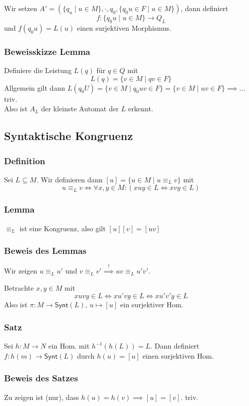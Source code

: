 \documentclass[12pt, german]{article}
\newcommand{\inv}{^{-1}}
\newcommand{\synt}{\mathsf{Synt}}
\begin{document}
	Wir setzen $A' = (\{q_u \mid u \in M\}, \cdot, q_0, \{q_0u \in F \mid u \in M\})$, dann definiert $$f: \{q_0u \mid u \in M\} \to Q_L$$ und $f(q_0u) = L(u)$ einen surjektiven Morphismus.
	
	\subsubsection{Beweisskizze Lemma}
	Definiere die Leistung $L(q)$ für $q \in Q$ mit $$L(q) = \{v \in M \mid qv \in F\}$$ Allgemein gilt dann $L(q_0U) = \{v \in M \mid q_0uv \in F\} = \{v \in M \mid uv \in F\} \implies \ldots$ triv. \\
	Also ist $A_L$ der kleinste Automat der $L$ erkennt.
	
	\subsection{Syntaktische Kongruenz}
	\subsubsection{Definition}
	Sei $L \subseteq M$. Wir definieren dann $[u] = \{u \in M \mid u \equiv_L v\}$ mit $$ u \equiv_L v \iff \forall x,y \in M : (xuy \in L \iff xvy \in L)$$
	
	\subsubsection{Lemma}
	$\equiv_L$ ist eine Kongruenz, also gilt $[u][v]=[uv]$ 
	
	\subsubsection{Beweis des Lemmas}
	Wir zeigen $u \equiv_L u'$ und $v \equiv_L v' \overset{!}{\implies} uv \equiv_L u'v'$. 
	
	Betrachte $x,y \in M$ mit $$xuvy \in L \iff xu'vy \in L \iff xu'v'y \in L$$ Also ist $\pi: M \to \synt(L), \, u \mapsto [u]$ ein surjektiver Hom. 
	
	\subsubsection{Satz}
	Sei $h: M \to N$ ein Hom. mit $h\inv(h(L)) = L$. Dann definiert $f:h(m) \to \synt(L)$ durch $h(u) = [u]$ einen surjektiven Hom. 
	
	\subsubsection{Beweis des Satzes}	 
	Zu zeigen ist (nur), dass $h(u) = h(v) \implies [u]=[v]$. triv.
	
\end{document}
